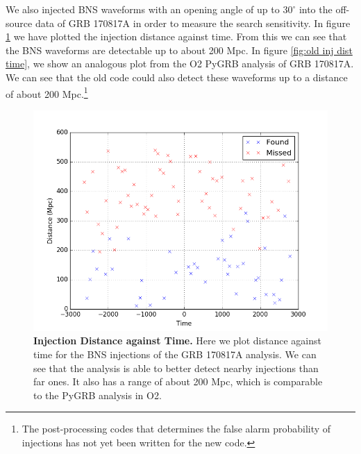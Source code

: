 \documentclass[11pt]{cuthesis}
\begin{document}
We also injected BNS waveforms with an opening angle of up to $30^\circ$ into the off-source data of GRB 170817A in order to measure the search sensitivity. In figure \ref{fig:inj dist time} we have plotted the injection distance against time. From this we can see that the BNS waveforms are detectable up to about 200 Mpc. In figure \ref{fig:old inj dist time}, we show an analogous plot from the O2 PyGRB analysis of GRB 170817A. We can see that the old code could also detect these waveforms up to a distance of about 200 Mpc.\footnote{The post-processing codes that determines the false alarm probability of injections has not yet been written for the new code.}






\begin{figure} %
\begin{center}
\includegraphics[width=0.8\linewidth]{injections_dist_time.png}
\end{center}
\caption{\textbf{Injection Distance against Time.} Here we plot distance against time for the BNS injections of the GRB 170817A analysis. We can see that the analysis is able to better detect nearby injections than far ones. It also has a range of about 200 Mpc, which is comparable to the PyGRB analysis in O2.} 
\label{fig:inj dist time}
\end{figure}
\end{document}
